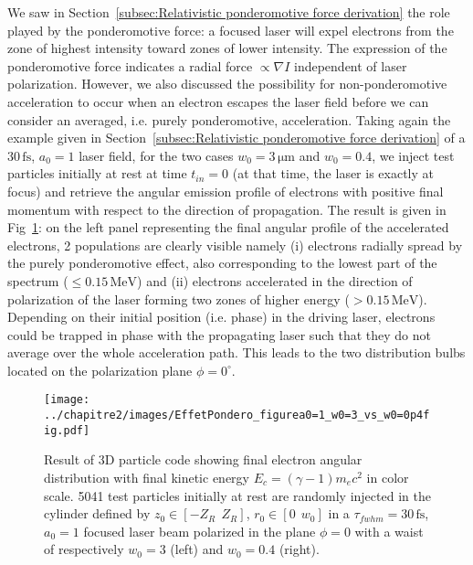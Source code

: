 We saw in Section~\ref{subsec:Relativistic ponderomotive force derivation} the role played by the ponderomotive force: a focused laser will expel electrons from the zone of highest intensity toward zones of lower intensity. The expression of the ponderomotive force indicates a radial force $\propto \nabla I$ independent of laser polarization. However, we also discussed the possibility for non-ponderomotive acceleration to occur when an electron escapes the laser field before we can consider an averaged, i.e. purely ponderomotive, acceleration. Taking again the example given in Section~\ref{subsec:Relativistic ponderomotive force derivation} of a $30\,\mathrm{fs}$, $a_0 = 1$ laser field, for the two cases $w_0 = 3\,\mathrm{\mu m}$ and $w_0 = 0.4$, we inject test particles initially at rest at time $t_{in} = 0$ (at that time, the laser is exactly at focus) and retrieve the angular emission profile of electrons with positive final momentum with respect to the direction of propagation. The result is given in Fig~\ref{Fig:EffetPondero_figurea0=1_a0=3}: on the left panel representing the final angular profile of the accelerated electrons, 2 populations are clearly visible namely (i) electrons radially spread by the purely ponderomotive effect, also corresponding to the lowest part of the spectrum ($\le 0.15\,\mathrm{MeV}$) and (ii) electrons accelerated in the direction of polarization of the laser forming two zones of higher energy ($>0.15 \,\mathrm{MeV}$). Depending on their initial position (i.e. phase) in the driving laser, electrons could be trapped in phase with the propagating laser such that they do not average over the whole acceleration path. This leads to the two distribution bulbs located on the polarization plane $\phi = 0^{\circ}$.

\begin{figure}[H]
\begin{center}
\texttt{[image: ../chapitre2/images/EffetPondero\_figurea0=1\_w0=3\_vs\_w0=0p4fig.pdf]}
\caption{\label{Fig:EffetPondero_figurea0=1_a0=3}Result of 3D particle code showing final electron angular distribution with final kinetic energy $E_c = (\gamma-1)m_ec^2$ in color scale. 5041 test particles initially at rest are randomly injected in the cylinder defined by $z_0 \in [-Z_R \ \ Z_R]$, $r_0\in [0 \ \ w_0]$ in a $\tau_{fwhm} = 30\,\mathrm{fs}$, $a_0 = 1$ focused laser beam polarized in the plane $\phi = 0$ with a waist of respectively $w_0=3$ (left) and $w_0 =0.4$ (right).}
\end{center}
\end{figure}

